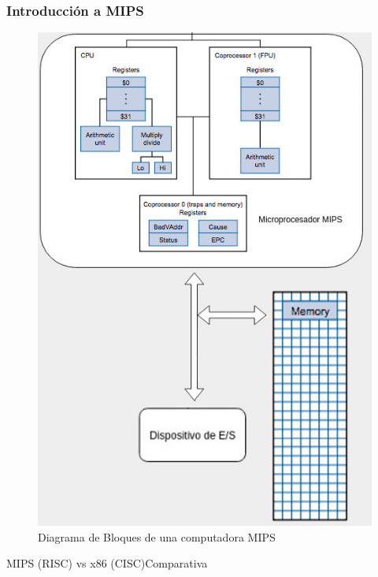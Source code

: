 \documentclass[aspectratio=169,compress]{beamer}
\begin{document}
\begin{footnotesize}

\begin{frame}
\frametitle{Introducción a MIPS}
\begin{center}
\begin{figure}
\includegraphics[scale=0.26]{images/mips-arq1.jpg} 
\caption{Diagrama de Bloques de una computadora MIPS}
\label{Diagrama de Bloques de una computadora MIPS}
\end{figure}
\end{center}
\end{frame}


\begin{frame}{MIPS (RISC) vs x86 (CISC)}{Comparativa}
\begin{footnotesize}
 \begin{columns}[onlytextwidth,T]


\end{columns}
\end{footnotesize}
\end{frame}
\end{footnotesize}
\end{document}
